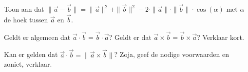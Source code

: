 \documentclass{ximera}
\begin{document}
\begin{exercise}
	Toon aan dat \( \| \vec{a} - \vec{b} \| = \|\vec{a}\|^2 + \|\vec{b}\|^2 - 2 \cdot \|\vec{a}\| \cdot \|\vec{b}\| \cdot \cos(\alpha)\) met \(\alpha\) de hoek tussen \(\vec{a}\) en \(\vec{b}\). 
\end{exercise}

\begin{exercise}
	Geldt er algemeen dat \(\vec{a} \cdot \vec{b} = \vec{b} \cdot \vec{a}\)? 
	Geldt er dat \(\vec{a} \times \vec{b} = \vec{b} \times \vec{a}\)? 
	Verklaar kort.
\end{exercise}

\begin{exercise}
	Kan er gelden dat \(\vec{a} \cdot \vec{b} = \| \vec{a} \times \vec{b} \|\)? 
	Zoja, geef de nodige voorwaarden en zoniet, verklaar. 
\end{exercise}
\end{document}
